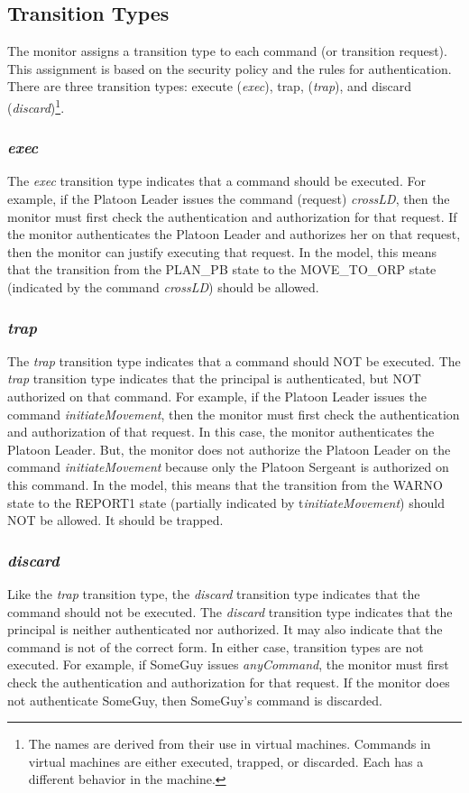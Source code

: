 \documentclass[../../main/main.tex]{subfiles}
\begin{document}
\subsection{Transition Types}
The monitor assigns a transition type to each command (or  transition request). This assignment is based on the security policy and the rules for authentication.  There are three transition types: execute (\textit{exec}), trap, (\textit{trap}), and discard (\textit{discard})\footnote{The names are derived from their use in virtual machines.  Commands in virtual machines are either executed, trapped, or discarded.  Each has a different behavior in the machine.}.  

\subsubsection{\textit{exec}}
The \textit{exec} transition type indicates that a command should be executed.  For example, if the Platoon Leader issues the command (request) \textit{crossLD}, then the monitor must first check the authentication and authorization for that request.  If the monitor authenticates the Platoon Leader and authorizes her on that request, then the monitor can justify executing that request.  In the  model, this means that the transition from the PLAN_PB state to the MOVE_TO_ORP state (indicated by the command \textit{crossLD}) should be allowed. 
\subsubsection{\textit{trap}}
The \textit{trap} transition type indicates that a command should NOT be executed.  The \textit{trap} transition type indicates that the principal is authenticated, but NOT authorized on that command.  For example, if the Platoon Leader issues the command \textit{initiateMovement}, then the monitor must first check the authentication and authorization of that request.  In this case, the monitor authenticates the Platoon Leader.  But, the monitor does not authorize the Platoon Leader on the command \textit{initiateMovement} because only the Platoon Sergeant is authorized on this command.  In the  model, this means that the transition from the WARNO state to the REPORT1 state (partially indicated by t\textit{initiateMovement}) should NOT be allowed.  It should be trapped.


\subsubsection{\textit{discard}}
Like the \textit{trap} transition type, the \textit{discard} transition type indicates that the command should not be executed.  The \textit{discard} transition type indicates that the principal is neither authenticated nor authorized.  It may also indicate that the command is not of the correct form.  In either case, transition types are not executed.  For example, if SomeGuy issues \textit{anyCommand}, the monitor must first check the authentication and authorization for that request. If the monitor does not authenticate SomeGuy, then SomeGuy's command is discarded.
\end{document}
